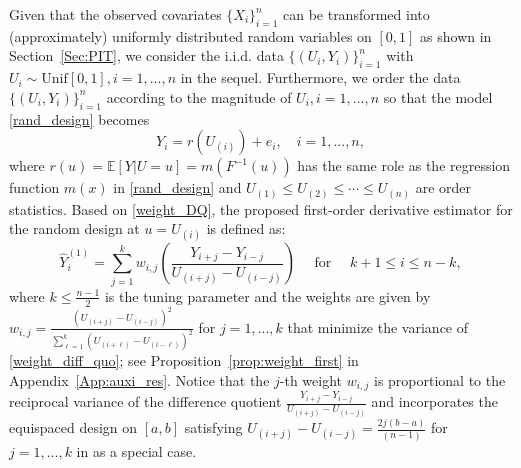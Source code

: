 \documentclass{uwstat572}
\theoremstyle{definition}
\renewcommand{\hat}{\widehat}
\theoremstyle{theorem}
\begin{document}
Given that the observed covariates $\{X_i\}_{i=1}^n$ can be transformed into (approximately) uniformly distributed random variables on $[0,1]$ as shown in Section~\ref{Sec:PIT}, we consider the i.i.d. data $\{(U_i,Y_i)\}_{i=1}^n$ with $U_i\sim \mathrm{Unif}[0,1], i=1,...,n$ in the sequel. Furthermore, we order the data $\{(U_i,Y_i)\}_{i=1}^n$ according to the magnitude of $U_i,i=1,...,n$ so that the model \eqref{rand_design} becomes
\begin{equation}
\label{rand_design_unif}
Y_i=r(U_{(i)}) + e_i, \quad i=1,...,n,
\end{equation}
where $r(u)=\mathbb{E}\left[Y|U=u\right] = m(F^{-1}(u))$ has the same role as the regression function $m(x)$ in \eqref{rand_design} and $U_{(1)} \leq U_{(2)} \leq \cdots \leq U_{(n)}$ are order statistics. Based on \eqref{weight_DQ}, the proposed first-order derivative estimator for the random design at $u=U_{(i)}$ is defined as:
\begin{equation}
\label{weight_diff_quo}
\hat{Y}_i^{(1)} = \sum_{j=1}^k w_{i,j} \left(\frac{Y_{i+j} - Y_{i-j}}{U_{(i+j)} - U_{(i-j)}}\right) \quad \text{ for } \quad k+1\leq i \leq n-k, 
\end{equation}
where $k \leq \frac{n-1}{2}$ is the tuning parameter and the weights are given by
$w_{i,j} = \frac{\left(U_{(i+j)} - U_{(i-j)}\right)^2}{\sum_{\ell=1}^k \left(U_{(i+\ell)} - U_{(i-\ell)}\right)^2}$ for $j=1,...,k$ that minimize the variance of \eqref{weight_diff_quo}; see Proposition~\ref{prop:weight_first} in Appendix~\ref{App:auxi_res}. Notice that the $j$-th weight $w_{i,j}$ is proportional to the reciprocal variance of the difference quotient $\frac{Y_{i+j} - Y_{i-j}}{U_{(i+j)} - U_{(i-j)}}$ and incorporates the equispaced design on $[a,b]$ satisfying $U_{(i+j)} - U_{(i-j)} = \frac{2j(b-a)}{(n-1)}$ for $j=1,...,k$ in \cite{charnigo2011generalized,de2013derivative} as a special case. 
\end{document}
